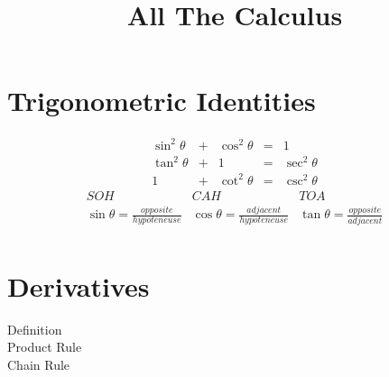 \documentclass[letterpaper,normalheadings,twocolumn]{scrreprt}
\title{All The Calculus}
\begin{document}
\maketitle

\chapter{Trigonometric Identities}
\[\begin{array}{ccccc}
\sin^2{\theta} &+& \cos^2{\theta} &=& 1 \\
\tan^2{\theta} &+& 1 &=& \sec^2{\theta} \\
1 &+& \cot^2{\theta} &=& \csc^2{\theta} 
\end{array}\]
\[\begin{array}{ccc}
SOH & CAH & TOA \\
\sin\theta = \frac{opposite}{hypoteneuse} & \cos\theta = \frac{adjacent}{hypoteneuse} & \tan\theta = \frac{opposite}{adjacent} \\
\end{array}\]


\chapter{Derivatives}

Definition \\
Product Rule \\
Chain Rule \\
\end{document}
